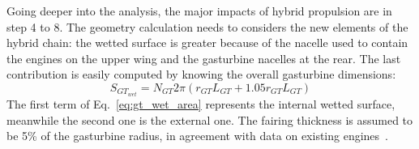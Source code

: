 Going deeper into the analysis, the major impacts of hybrid propulsion are in step 4 to 8. 
The geometry calculation needs to considers the new elements of the hybrid chain: the wetted surface is greater because of the nacelle used to contain the engines on the upper wing and the gasturbine nacelles at the rear. 
The last contribution is easily computed by knowing the overall gasturbine dimensions: 
\begin{equation}
	\label{eq:gt_wet_area}
	S_{{GT}_{wet}} = N_{GT}2\pi\left(r_{GT}L_{GT} + 1.05r_{GT} L_{GT}\right)
\end{equation}
The first term of Eq.~\eqref{eq:gt_wet_area} represents the internal wetted surface, meanwhile the second one is the external one. 
The fairing thickness is assumed to be 5\% of the gasturbine radius, in agreement with data on existing engines~\cite{bib:roux_eng_data}.

